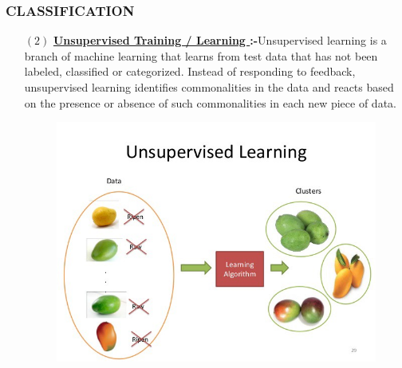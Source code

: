 \documentclass{beamer}
\begin{document}
\begin{frame}
\transsplitverticalout

\frametitle{CLASSIFICATION}

\begin{enumerate}
\item[$(2)$] {\bf \underline {Unsupervised Training / Learning }:-}\pause Unsupervised learning is a branch of machine learning that learns from test data that has not been labeled, classified or categorized. Instead of responding to feedback, unsupervised learning identifies commonalities in the data and reacts based on the presence or absence of such commonalities in each new piece of data.\pause

\begin{figure}
\includegraphics[width=.5\textwidth]{uns.jpeg} \pause

\end{figure}
\end{enumerate}


\end{frame}
\end{document}
